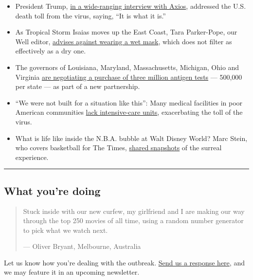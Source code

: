 \begin{itemize}
\item
  President Trump,
  \href{https://www.axios.com/full-axios-hbo-interview-donald-trump-cd5a67e1-6ba1-46c8-bb3d-8717ab9f3cc5.html}{in
  a wide-ranging interview with Axios}, addressed the U.S. death toll
  from the virus, saying, ``It is what it is.''
\item
  As Tropical Storm Isaias moves up the East Coast, Tara Parker-Pope,
  our Well editor,
  \href{https://www.nytimes.com/2020/08/04/us/isaias-storm-updates.html\#link-e77dd06}{advises
  against wearing a wet mask}, which does not filter as effectively as a
  dry one.
\item
  The governors of Louisiana, Maryland, Massachusetts, Michigan, Ohio
  and Virginia
  \href{https://www.nytimes.com/2020/08/04/world/coronavirus-cases.html\#link-5673bec1}{are
  negotiating a purchase of three million antigen tests} --- 500,000 per
  state --- as part of a new partnership.
\item
  ``We were not built for a situation like this'': Many medical
  facilities in poor American communities
  \href{https://www.nytimes.com/2020/08/04/us/texas-coronavirus-rio-grande-valley-starr-county.html}{lack
  intensive-care units}, exacerbating the toll of the virus.
\item
  What is life like inside the N.B.A. bubble at Walt Disney World? Marc
  Stein, who covers basketball for The Times,
  \href{https://www.nytimes.com/interactive/2020/08/04/sports/nba-bubble-coronavirus.html}{shared
  snapshots} of the surreal experience.
\end{itemize}

\begin{center}\rule{0.5\linewidth}{\linethickness}\end{center}

\hypertarget{what-youre-doing}{%
\subsection{What you're doing}\label{what-youre-doing}}

\begin{quote}
Stuck inside with our new curfew, my girlfriend and I are making our way
through the top 250 movies of all time, using a random number generator
to pick what we watch next.

--- Oliver Bryant, Melbourne, Australia
\end{quote}

Let us know how you're dealing with the outbreak.
\href{https://www.nytimes.com/2020/03/02/reader-center/coronavirus-preparation.html}{Send
us a response here}, and we may feature it in an upcoming newsletter.

